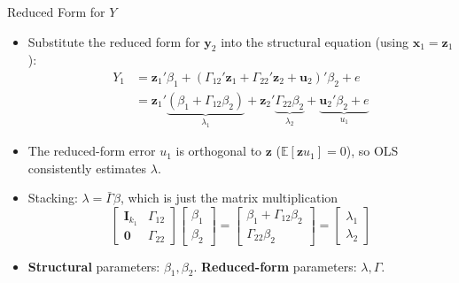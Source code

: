 \documentclass[aspectratio=169, handout]{beamer}
\numberwithin{equation}{section}
\begin{document}
\begin{frame}{Reduced Form for $Y$}
\begin{itemize}
\item Substitute the reduced form for $\bm{y}_2$ into the structural equation (using $\bm{x}_1=\bm{z}_1$):
\begin{align*}
Y_1 &= \bm{z}_1'\beta_1 + (\Gamma_{12}'\bm{z}_1 + \Gamma_{22}'\bm{z}_2+\bm{u}_2)'\beta_2 + e\\
&= \bm{z}_1'\underbrace{(\beta_1+\Gamma_{12}\beta_2)}_{\lambda_1} + \bm{z}_2'\underbrace{\Gamma_{22}\beta_2}_{\lambda_2} + \underbrace{\bm{u}_2'\beta_2+e}_{u_1}
\end{align*}
\item The reduced-form error $u_1$ is orthogonal to $\bm{z}$ ($\mathbb{E}[\bm{z}u_1]=0$), so OLS consistently estimates $\lambda$.
\item Stacking: $\lambda = \bar{\Gamma}\beta$, which is just the matrix multiplication
$$\begin{bmatrix} \bm{I}_{k_1} & \Gamma_{12}\\ \bm{0} & \Gamma_{22}\end{bmatrix}\!\!\begin{bmatrix}\beta_1\\ \beta_2\end{bmatrix} = \begin{bmatrix}\beta_1+\Gamma_{12}\beta_2\\ \Gamma_{22}\beta_2\end{bmatrix}=\begin{bmatrix}\lambda_1\\ \lambda_2\end{bmatrix}$$
\item \textbf{Structural} parameters: $\beta_1,\beta_2$. \quad \textbf{Reduced-form} parameters: $\lambda, \Gamma$.
\end{itemize}
\end{frame}
\end{document}
